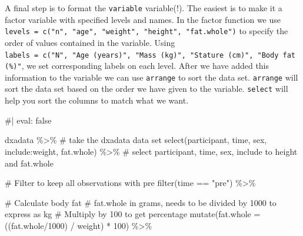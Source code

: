 \documentclass[
  11pt,
  letterpaper,
]{scrbook}
\newenvironment{Shaded}{\begin{snugshade}}{\end{snugshade}}
\newcommand{\AttributeTok}[1]{\textcolor[rgb]{0.40,0.45,0.13}{#1}}
\newcommand{\CommentTok}[1]{\textcolor[rgb]{0.37,0.37,0.37}{#1}}
\newcommand{\DecValTok}[1]{\textcolor[rgb]{0.68,0.00,0.00}{#1}}
\newcommand{\FunctionTok}[1]{\textcolor[rgb]{0.28,0.35,0.67}{#1}}
\newcommand{\NormalTok}[1]{\textcolor[rgb]{0.00,0.23,0.31}{#1}}
\newcommand{\SpecialCharTok}[1]{\textcolor[rgb]{0.37,0.37,0.37}{#1}}
\newcommand{\StringTok}[1]{\textcolor[rgb]{0.13,0.47,0.30}{#1}}
\begin{document}
A final step is to format the \texttt{variable} variable(!). The easiest
is to make it a factor variable with specified levels and names. In the
factor function we use
\texttt{levels\ =\ c("n",\ "age",\ "weight",\ "height",\ "fat.whole")}
to specify the order of values contained in the variable. Using
\texttt{labels\ =\ c("N",\ "Age\ (years)",\ "Mass\ (kg)",\ "Stature\ (cm)",\ "Body\ fat\ (\%)"},
we set corresponding labels on each level. After we have added this
information to the variable we can use \texttt{arrange} to sort the data
set. \texttt{arrange} will sort the data set based on the order we have
given to the variable. \texttt{select} will help you sort the columns to
match what we want.

\begin{Shaded}
\begin{Highlighting}[numbers=left,,]
\CommentTok{\#| eval: false}

\NormalTok{dxadata }\SpecialCharTok{\%\textgreater{}\%} \CommentTok{\# take the dxadata data set}
  \FunctionTok{select}\NormalTok{(participant, time, sex, include}\SpecialCharTok{:}\NormalTok{weight, fat.whole) }\SpecialCharTok{\%\textgreater{}\%} 
  \CommentTok{\# select participant, time, sex, include to height and fat.whole}
  
  \CommentTok{\# Filter to keep all observations with pre}
  \FunctionTok{filter}\NormalTok{(time }\SpecialCharTok{==} \StringTok{"pre"}\NormalTok{) }\SpecialCharTok{\%\textgreater{}\%}
  
  \CommentTok{\# Calculate body fat}
  \CommentTok{\# fat.whole in grams, needs to be divided by 1000 to express as kg}
  \CommentTok{\# Multiply by 100 to get percentage}
  \FunctionTok{mutate}\NormalTok{(}\AttributeTok{fat.whole =}\NormalTok{ ((fat.whole}\SpecialCharTok{/}\DecValTok{1000}\NormalTok{) }\SpecialCharTok{/}\NormalTok{ weight) }\SpecialCharTok{*} \DecValTok{100}\NormalTok{) }\SpecialCharTok{\%\textgreater{}\%}
  

\end{Highlighting}
\end{Shaded}
\end{document}
